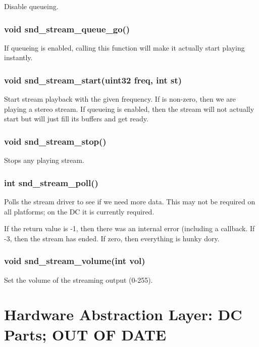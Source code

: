 \documentclass[english]{report}
\begin{document}
Disable queueing.

\subsection{void snd\_stream\_queue\_go()}

If queueing is enabled, calling this function will make it actually start
playing instantly.

\subsection{void snd\_stream\_start(uint32 freq, int st)}

Start stream playback with the given frequency. If  is
non-zero, then we are playing a stereo stream. If queueing is enabled,
then the stream will not actually start but will just fill its buffers
and get ready.

\subsection{void snd\_stream\_stop()}

Stops any playing stream.

\subsection{int snd\_stream\_poll()}

Polls the stream driver to see if we need more data. This may not be
required on all platforms; on the DC it is currently required.

If the return value is -1, then there was an internal error (including
a  callback. If -3, then the stream has ended. If zero,
then everything is hunky dory.

\subsection{void snd\_stream\_volume(int vol)}

Set the volume of the streaming output (0-255).




\chapter{Hardware Abstraction Layer: DC Parts; OUT OF DATE}
\end{document}
